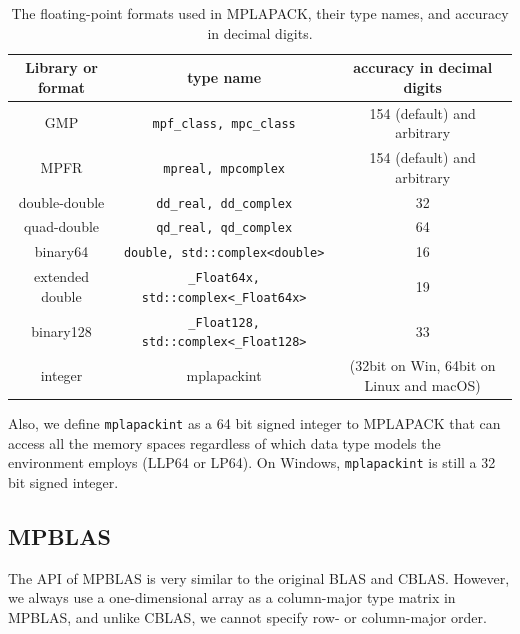 \documentclass[12pt]{article}
\begin{document}
\begin{table}
\caption{The floating-point formats used in MPLAPACK, their type names, and accuracy in decimal digits.}\label{mplapackformats}
\begin{center}
\begin{tabular}{c|c|c} \hline
Library or format & type name & accuracy in decimal digits \\ \hline
GMP             & {\tt mpf\_class, mpc\_class}       & 154 (default) and arbitrary\\
MPFR            & {\tt mpreal, mpcomplex}            & 154 (default) and arbitrary \\
double-double   & {\tt dd\_real, dd\_complex}        & 32\\
quad-double     & {\tt qd\_real, qd\_complex}        & 64 \\
binary64        & {\tt double, std::complex<double>} & 16 \\
extended double & {\tt \_Float64x, std::complex<\_Float64x>} & 19  \\
binary128       & {\tt \_Float128, std::complex<\_Float128>} & 33 \\ 
integer         & mplapackint & (32bit on Win, 64bit on Linux and macOS) \\ \hline
\end{tabular}
\end{center}
\end{table}
Also, we define {\tt mplapackint} as a 64 bit signed integer to MPLAPACK that can access all the memory spaces regardless
of which data type models the environment employs (LLP64 or LP64). On Windows, {\tt mplapackint} is still a 32 bit signed integer.

\subsection{MPBLAS}
The API of MPBLAS is very similar to the original BLAS and CBLAS. However, we always use a one-dimensional array as a column-major type matrix in MPBLAS, and unlike CBLAS, we cannot specify row- or column-major order. 
\end{document}
